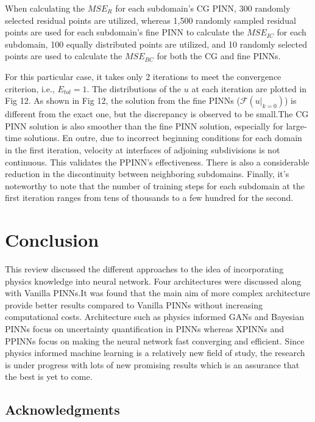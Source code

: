 \documentclass[conference,compsoc]{IEEEtran}
\begin{document}
When calculating the $MSE_R$ for each subdomain's CG PINN, 300 randomly selected residual points are utilized, whereas 1,500 randomly sampled residual points are used for each subdomain's fine PINN to calculate the $MSE_{IC}$ for each subdomain, 100 equally distributed points are utilized, and 10 randomly selected points are used to calculate the $MSE_{BC}$ for both the CG and fine PINNs. 

For this particular case, it takes only 2 iterations to meet the convergence criterion, i.e., $E_{tol} = 1 $. The distributions of the $u$ at each iteration are plotted in Fig 12. As shown in Fig 12, the solution from the fine PINNs ($\mathcal{F}(u|_{k=0})$) is different from the exact one, but the discrepancy is observed to be small\cite{meng2020ppinn}.The CG PINN solution is also smoother than the fine PINN solution, especially for large-time solutions. En outre, due to incorrect beginning conditions for each domain in the first iteration, velocity at interfaces of adjoining subdivisions is not continuous. This validates the PPINN's effectiveness\cite{meng2020ppinn}. There is also a considerable reduction in the discontinuity between neighboring subdomains. Finally, it's noteworthy to note that the number of training steps for each subdomain at the first iteration ranges from tens of thousands to a few hundred for the second\cite{meng2020ppinn}.






\section{Conclusion}
This review discussed the different approaches to the idea of incorporating physics knowledge into neural network. Four architectures were discussed along with Vanilla PINNs.It was found that the main aim of more complex architecture provide better results compared to Vanilla PINNs without increasing computational costs. Architecture such as physics informed GANs and Bayesian PINNs focus on uncertainty quantification in PINNs whereas XPINNs and PPINNs focus on making the neural network fast converging and efficient.
 Since physics informed machine learning is a relatively new field of study, the research is under progress with lots of new promising results which is an assurance that the best is yet to come.

\ifCLASSOPTIONcompsoc
  \subsection*{Acknowledgments}
\else
\end{document}
